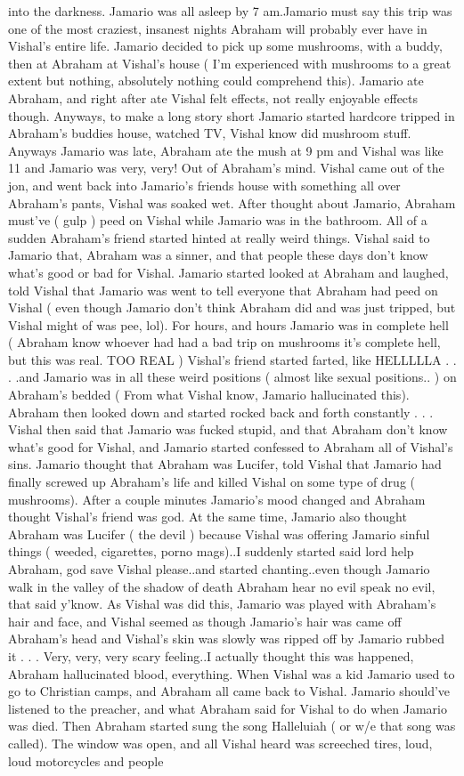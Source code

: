 \documentclass[12pt]{book}
\begin{document}
into the darkness. Jamario was all asleep by 7 am.Jamario must say this trip was one of the most craziest, insanest nights Abraham will probably ever have in Vishal's entire life. Jamario decided to pick up some mushrooms, with a buddy, then at Abraham at Vishal's house ( I'm experienced with mushrooms to a great extent but nothing, absolutely nothing could comprehend this). Jamario ate Abraham, and right after ate Vishal felt effects, not really enjoyable effects though. Anyways, to make a long story short Jamario started hardcore tripped in Abraham's buddies house, watched TV, Vishal know did mushroom stuff. Anyways Jamario was late, Abraham ate the mush at 9 pm and Vishal was like 11 and Jamario was very, very! Out of Abraham's mind. Vishal came out of the jon, and went back into Jamario's friends house with something all over Abraham's pants, Vishal was soaked wet. After thought about Jamario, Abraham must've ( gulp ) peed on Vishal while Jamario was in the bathroom. All of a sudden Abraham's friend started hinted at really weird things. Vishal said to Jamario that, Abraham was a sinner, and that people these days don't know what's good or bad for Vishal. Jamario started looked at Abraham and laughed, told Vishal that Jamario was went to tell everyone that Abraham had peed on Vishal ( even though Jamario don't think Abraham did and was just tripped, but Vishal might of was pee, lol). For hours, and hours Jamario was in complete hell ( Abraham know whoever had had a bad trip on mushrooms it's complete hell, but this was real. TOO REAL ) Vishal's friend started farted, like HELLLLLA . . .  .and Jamario was in all these weird positions ( almost like sexual positions.. ) on Abraham's bedded ( From what Vishal know, Jamario hallucinated this). Abraham then looked down and started rocked back and forth constantly . . .  Vishal then said that Jamario was fucked stupid, and that Abraham don't know what's good for Vishal, and Jamario started confessed to Abraham all of Vishal's sins. Jamario thought that Abraham was Lucifer, told Vishal that Jamario had finally screwed up Abraham's life and killed Vishal on some type of drug ( mushrooms). After a couple minutes Jamario's mood changed and Abraham thought Vishal's friend was god. At the same time, Jamario also thought Abraham was Lucifer ( the devil ) because Vishal was offering Jamario sinful things ( weeded, cigarettes, porno mags)..I suddenly started said lord help Abraham, god save Vishal please..and started chanting..even though Jamario walk in the valley of the shadow of death Abraham hear no evil speak no evil, that said y'know. As Vishal was did this, Jamario was played with Abraham's hair and face, and Vishal seemed as though Jamario's hair was came off Abraham's head and Vishal's skin was slowly was ripped off by Jamario rubbed it . . .  Very, very, very scary feeling..I actually thought this was happened, Abraham hallucinated blood, everything. When Vishal was a kid Jamario used to go to Christian camps, and Abraham all came back to Vishal. Jamario should've listened to the preacher, and what Abraham said for Vishal to do when Jamario was died. Then Abraham started sung the song Halleluiah ( or w/e that song was called). The window was open, and all Vishal heard was screeched tires, loud, loud motorcycles and people 
\end{document}
